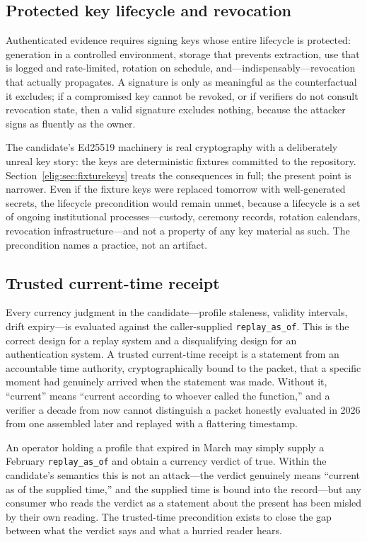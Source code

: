 \subsection{Protected key lifecycle and revocation}\label{elig:sec:keys}

Authenticated evidence requires signing keys whose entire lifecycle is protected: generation in a controlled environment, storage that prevents extraction, use that is logged and rate-limited, rotation on schedule, and---indispensably---revocation that actually propagates. A signature is only as meaningful as the counterfactual it excludes; if a compromised key cannot be revoked, or if verifiers do not consult revocation state, then a valid signature excludes nothing, because the attacker signs as fluently as the owner.

The candidate's Ed25519 machinery is real cryptography with a deliberately unreal key story: the keys are deterministic fixtures committed to the repository. Section~\ref{elig:sec:fixturekeys} treats the consequences in full; the present point is narrower. Even if the fixture keys were replaced tomorrow with well-generated secrets, the lifecycle precondition would remain unmet, because a lifecycle is a set of ongoing institutional processes---custody, ceremony records, rotation calendars, revocation infrastructure---and not a property of any key material as such. The precondition names a practice, not an artifact.

\subsection{Trusted current-time receipt}\label{elig:sec:time}

Every currency judgment in the candidate---profile staleness, validity intervals, drift expiry---is evaluated against the caller-supplied \texttt{replay\_as\_of}. This is the correct design for a replay system and a disqualifying design for an authentication system. A trusted current-time receipt is a statement from an accountable time authority, cryptographically bound to the packet, that a specific moment had genuinely arrived when the statement was made. Without it, ``current'' means ``current according to whoever called the function,'' and a verifier a decade from now cannot distinguish a packet honestly evaluated in 2026 from one assembled later and replayed with a flattering timestamp.

\begin{threat}\label{elig:threat:time}
An operator holding a profile that expired in March may simply supply a February \texttt{replay\_as\_of} and obtain a currency verdict of true. Within the candidate's semantics this is not an attack---the verdict genuinely means ``current as of the supplied time,'' and the supplied time is bound into the record---but any consumer who reads the verdict as a statement about the present has been misled by their own reading. The trusted-time precondition exists to close the gap between what the verdict says and what a hurried reader hears.
\end{threat}

